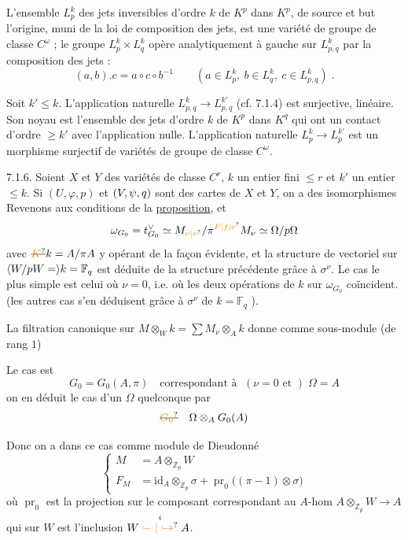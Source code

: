 L'ensemble $L^k_p$ des jets inversibles d'ordre $k$ de $K^p$ dans $K^p$, de source et but l'origine, muni de la loi de composition des jets, est une variété de groupe de classe $C^\omega$ ; le groupe $L^k_p\times L^k_q$ opère analytiquement à gauche sur $L^k_{p,q}$ par la composition des jets :
\[
(a,b).c=a\circ c\circ b^{-1}\qquad (a\in L^k_p,\ b\in L^k_q,\ c\in L^k_{p,q})\;.
\]

Soit $k'\leq k$. L'application naturelle $L^k_{p,q}\longrightarrow L^{k'}_{p,q}$ (cf. 7.1.4) est surjective, linéaire. Son noyau est l'ensemble des jets d'ordre $k$ de $K^p$ dans $K^q$ qui ont un contact d'ordre $\geq k'$ avec l'application nulle. L'application naturelle $L^k_p\longrightarrow L^{k'}_p$ est un morphisme surjectif de variétés de groupe de classe $C^\omega$.

7.1.6. Soient $X$ et $Y$ des variétés de classe $C^r$, $k$ un entier fini $\leq r$ et $k'$ un entier $\leq k$. Si $(U,\varphi,p)$ et $(V,\psi,q)$ sont des cartes de $X$ et $Y$, on a des isomorphismes
Revenons aux conditions de la \uline{proposition}, et 
\[
\omega_{G_0}=t_{G_0}^{\vee}\simeq M_{\unsure{\nu|v}}/\pi^{\unsure{F|f|r}}M_\nu\simeq \Omega/p\Omega
\]
avec $\deleted{\unsure{K}}k=A/\pi A$ y opérant de la façon évidente, et la structure de vectoriel sur $\inserted{W/pW=}k=\mathbb F_q$ est déduite de la structure précédente grâce à $\sigma^\nu$. Le cas le plus simple est celui où $\nu=0$, i.e. où  les deux opérations de $k$ sur $\omega_{G_0}$ coïncident.  (les autres cas s'en déduisent grâce à  $\sigma^\nu$ de $k=\mathbb F_q$ ).

La filtration canonique sur $M\otimes_W k=\sum M_\nu\otimes_A k$ donne comme sous-module (de rang $1$)  

Le cas  est
\[
G_0=G_0(A,\pi)\quad\text{correspondant à }\;(\nu=0\text{ et })\;\Omega=A
\]
on en déduit le cas d'un $\Omega$ quelconque par
\[
\deleted{\unsure{G_0}}\quad\Omega\otimes_A G_0(A)
\]

Donc on a dans ce cas comme module de Dieudonné
\[
\left\{\begin{aligned}
M&=A\otimes_{\mathbb Z_p}W\\
F_M&=\mathrm{id}_A\otimes_{\mathbb Z_p}\sigma+\operatorname{pr}_0\bigl((\pi-1)\otimes\sigma\bigr)
\end{aligned}\right.
\]
où $\operatorname{pr}_0$ est la projection sur le composant correspondant au $A$-hom $A\otimes_{\mathbb Z_p}W\longrightarrow A$ qui sur $W$ est l'inclusion $W\mathrel{\overset{i}{\unsure{\lhook\joinrel\relbar|\hookrightarrow}}}A$.

